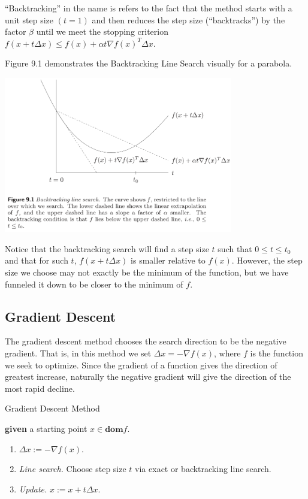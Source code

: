 ``Backtracking'' in the name is refers to the fact that the method starts with a unit step size $(t=1)$ and then reduces the step size (``backtracks'') by the factor $\beta$ until we meet the stopping criterion $f(x+t\Delta x)\leq f(x)+\alpha t\nabla f(x)^T\Delta x$.


Figure 9.1 \cite[p. 465]{Boyd2004} demonstrates the Backtracking Line Search visually for a parabola.
\begin{center}
	\includegraphics[width=0.75\textwidth]{Chapter_I_Background/Images/backtracking_line_search_diagram.png}
\end{center}

Notice that the backtracking search will find a step size $t$ such that $0\leq t\leq t_0$ and that for such $t$, $f(x+t\Delta x)$ is smaller relative to $f(x)$. However, the step size we choose may not exactly be the minimum of the function, but we have funneled it down to be closer to the minimum of $f$.
\subsection{Gradient Descent}

The gradient descent method chooses the search direction to be the negative gradient. That is, in this method we set $\Delta x=-\nabla f(x)$, where $f$ is the function we seek to optimize. Since the gradient of a function gives the direction of greatest increase, naturally the negative gradient will give the direction of the most rapid decline.

\begin{algorithm}
	\caption{Gradient Descent Method \cite[]{Boyd2004}\label{GradientDescentAlg}}
	\begin{algorithmic} 
		\State \textbf{given} a starting point $x\in\textbf{dom}f$.
		\Repeat
		\begin{enumerate}
			\item $\Delta x:=-\nabla f(x)$.
			\item \textit{Line search.} Choose step size $t$ via exact or backtracking line search.
			\item \textit{Update.} $x:=x+t\Delta x$.
		\end{enumerate}
	\end{algorithmic}
\end{algorithm}

